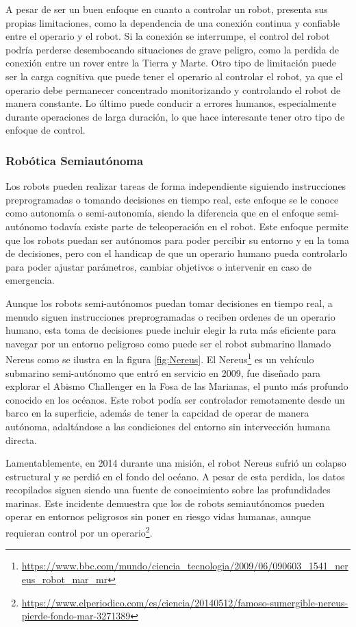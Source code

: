 A pesar de ser un buen enfoque en cuanto a controlar un robot, presenta sus propias limitaciones, como la dependencia de una conexión continua y confiable entre
el operario y el robot. Si la conexión se interrumpe, el control del robot podría perderse desembocando situaciones de grave peligro, como la perdida de conexión entre un rover entre 
la Tierra y Marte. Otro tipo de limitación puede ser la carga
cognitiva que puede tener el operario al controlar el robot, ya que el operario debe permanecer concentrado monitorizando y controlando el robot de manera constante.
Lo último puede conducir a errores humanos, especialmente durante operaciones de larga duración, lo que hace interesante tener otro tipo de enfoque de control.

\subsubsection{Robótica Semiautónoma}
\label{sec:subseccion}
Los robots pueden realizar tareas de forma independiente siguiendo instrucciones preprogramadas o tomando decisiones en tiempo real, este enfoque se le conoce como autonomía o semi-autonomía, 
siendo la diferencia que en el enfoque semi-autónomo todavía existe parte de teleoperación en el robot. Este enfoque permite que los robots puedan ser autónomos para poder
percibir su entorno y en la toma de decisiones, pero con el handicap de que un operario humano pueda controlarlo para poder ajustar parámetros, cambiar objetivos o intervenir 
en caso de emergencia. 

Aunque los robots semi-autónomos puedan tomar decisiones en tiempo real, a menudo siguen instrucciones preprogramadas o reciben ordenes de un operario humano, esta toma de decisiones
puede incluir elegir la ruta más eficiente para navegar por un entorno peligroso como puede ser el robot submarino llamado Nereus como se ilustra en la figura \ref{fig:Nereus}. 
El Nereus\footnote{\url{https://www.bbc.com/mundo/ciencia_tecnologia/2009/06/090603_1541_nereus_robot_mar_mr}} 
es un vehículo submarino semi-autónomo que entró en servicio en 2009, fue diseñado para explorar el Abismo Challenger en la Fosa de las Marianas, el punto más profundo conocido en los 
océanos. Este robot podía ser controlador remotamente desde un barco en la superficie, además de tener la capcidad de operar de manera autónoma, adaltándose a las condiciones del entorno
sin intervección humana directa.

Lamentablemente, en 2014 durante una misión, el robot Nereus sufrió un colapso estructural y se perdió en el fondo del océano. A pesar de esta perdida, los datos recopilados
siguen siendo una fuente de conocimiento sobre las profundidades marinas. Este incidente demuestra que los de robots semiautónomos pueden operar en entornos peligrosos sin poner 
en riesgo vidas humanas, aunque requieran control por un operario\footnote{\url{https://www.elperiodico.com/es/ciencia/20140512/famoso-sumergible-nereus-pierde-fondo-mar-3271389}}. 

